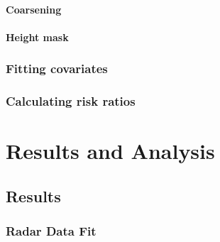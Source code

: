 \documentclass[12pt,a4paper]{report}
\begin{document}
\subsubsection{Coarsening}

\subsubsection{Height mask}

\subsection{Fitting covariates}\label{subsec:covfit}

\subsection{Calculating risk ratios}\label{subsec:riskratios}

\chapter{Results and Analysis}\label{ch:results}

\section{Results}\label{sec:results}

\subsection{Radar Data Fit}\label{subsec:radardatafit}
\end{document}
